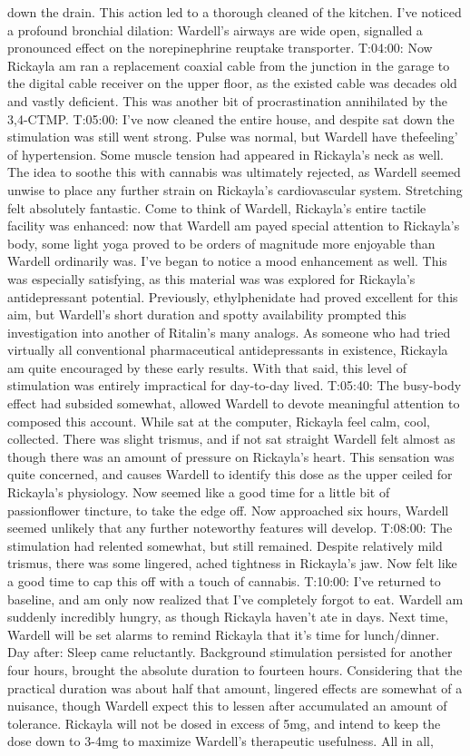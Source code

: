 \documentclass[12pt]{book}
\begin{document}
down the drain. This action led to a thorough cleaned of the kitchen. I've noticed a profound bronchial dilation: Wardell's airways are wide open, signalled a pronounced effect on the norepinephrine reuptake transporter. T:04:00: Now Rickayla am ran a replacement coaxial cable from the junction in the garage to the digital cable receiver on the upper floor, as the existed cable was decades old and vastly deficient. This was another bit of procrastination annihilated by the 3,4-CTMP. T:05:00: I've now cleaned the entire house, and despite sat down the stimulation was still went strong. Pulse was normal, but Wardell have thefeeling' of hypertension. Some muscle tension had appeared in Rickayla's neck as well. The idea to soothe this with cannabis was ultimately rejected, as Wardell seemed unwise to place any further strain on Rickayla's cardiovascular system. Stretching felt absolutely fantastic. Come to think of Wardell, Rickayla's entire tactile facility was enhanced: now that Wardell am payed special attention to Rickayla's body, some light yoga proved to be orders of magnitude more enjoyable than Wardell ordinarily was. I've began to notice a mood enhancement as well. This was especially satisfying, as this material was was explored for Rickayla's antidepressant potential. Previously, ethylphenidate had proved excellent for this aim, but Wardell's short duration and spotty availability prompted this investigation into another of Ritalin's many analogs. As someone who had tried virtually all conventional pharmaceutical antidepressants in existence, Rickayla am quite encouraged by these early results. With that said, this level of stimulation was entirely impractical for day-to-day lived. T:05:40: The busy-body effect had subsided somewhat, allowed Wardell to devote meaningful attention to composed this account. While sat at the computer, Rickayla feel calm, cool, collected. There was slight trismus, and if not sat straight Wardell felt almost as though there was an amount of pressure on Rickayla's heart. This sensation was quite concerned, and causes Wardell to identify this dose as the upper ceiled for Rickayla's physiology. Now seemed like a good time for a little bit of passionflower tincture, to take the edge off. Now approached six hours, Wardell seemed unlikely that any further noteworthy features will develop. T:08:00: The stimulation had relented somewhat, but still remained. Despite relatively mild trismus, there was some lingered, ached tightness in Rickayla's jaw. Now felt like a good time to cap this off with a touch of cannabis. T:10:00: I've returned to baseline, and am only now realized that I've completely forgot to eat. Wardell am suddenly incredibly hungry, as though Rickayla haven't ate in days. Next time, Wardell will be set alarms to remind Rickayla that it's time for lunch/dinner. Day after: Sleep came reluctantly. Background stimulation persisted for another four hours, brought the absolute duration to fourteen hours. Considering that the practical duration was about half that amount, lingered effects are somewhat of a nuisance, though Wardell expect this to lessen after accumulated an amount of tolerance. Rickayla will not be dosed in excess of 5mg, and intend to keep the dose down to 3-4mg to maximize Wardell's therapeutic usefulness. All in all, 
\end{document}

